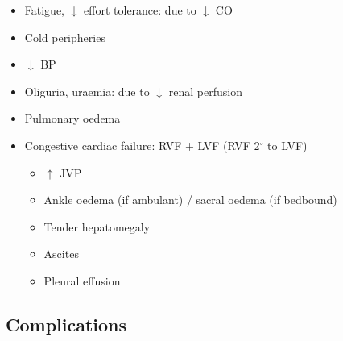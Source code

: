 \documentclass[
  12pt,
]{memoir}
\providecommand{\tightlist}{%
  \setlength{\itemsep}{0pt}\setlength{\parskip}{0pt}}
\begin{document}
\begin{itemize}
\tightlist
\item
  Fatigue, \(\downarrow\) effort tolerance: due to \(\downarrow\) CO
\item
  Cold peripheries
\item
  \(\downarrow\) BP
\item
  Oliguria, uraemia: due to \(\downarrow\) renal perfusion
\item
  Pulmonary oedema
\item
  Congestive cardiac failure: RVF + LVF (RVF 2\(^\circ\) to LVF)

  \begin{itemize}
  \tightlist
  \item
    \(\uparrow\) JVP
  \item
    Ankle oedema (if ambulant) / sacral oedema (if bedbound)
  \item
    Tender hepatomegaly
  \item
    Ascites
  \item
    Pleural effusion
  \end{itemize}
\end{itemize}

\hypertarget{complications-1}{%
\subsection{Complications}\label{complications-1}}
\end{document}
